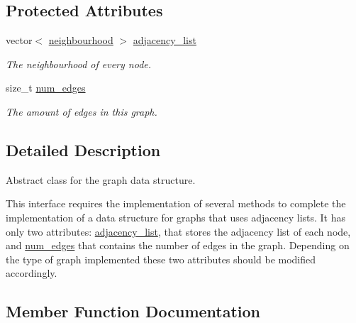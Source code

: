 \subsection*{Protected Attributes}
\begin{DoxyCompactItemize}
\item 
vector$<$ \hyperlink{namespacelgraph_1_1utils_a0f2ef47028a466d26841709e705390ac}{neighbourhood} $>$ \hyperlink{classlgraph_1_1utils_1_1xxgraph_a1d5fda0d5aa89340f997428b982f966f}{adjacency\+\_\+list}\hypertarget{classlgraph_1_1utils_1_1xxgraph_a1d5fda0d5aa89340f997428b982f966f}{}\label{classlgraph_1_1utils_1_1xxgraph_a1d5fda0d5aa89340f997428b982f966f}

\begin{DoxyCompactList}\small\item\em The neighbourhood of every node. \end{DoxyCompactList}\item 
size\+\_\+t \hyperlink{classlgraph_1_1utils_1_1xxgraph_a217ebb1cd8946fedfbf94a9b22f7da48}{num\+\_\+edges}\hypertarget{classlgraph_1_1utils_1_1xxgraph_a217ebb1cd8946fedfbf94a9b22f7da48}{}\label{classlgraph_1_1utils_1_1xxgraph_a217ebb1cd8946fedfbf94a9b22f7da48}

\begin{DoxyCompactList}\small\item\em The amount of edges in this graph. \end{DoxyCompactList}\end{DoxyCompactItemize}


\subsection{Detailed Description}
Abstract class for the graph data structure. 

This interface requires the implementation of several methods to complete the implementation of a data structure for graphs that uses adjacency lists. It has only two attributes\+: \hyperlink{classlgraph_1_1utils_1_1xxgraph_a1d5fda0d5aa89340f997428b982f966f}{adjacency\+\_\+list}, that stores the adjacency list of each node, and \hyperlink{classlgraph_1_1utils_1_1xxgraph_a217ebb1cd8946fedfbf94a9b22f7da48}{num\+\_\+edges} that contains the number of edges in the graph. Depending on the type of graph implemented these two attributes should be modified accordingly. 

\subsection{Member Function Documentation}
